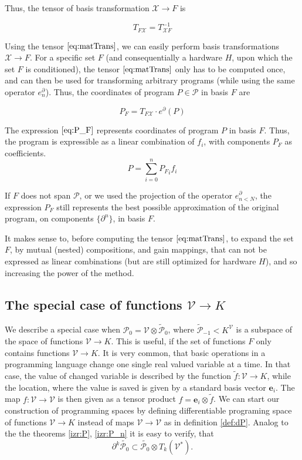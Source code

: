 \documentclass{article}
\newcommand{\VV}{\mathcal{V}}
\newcommand{\e}{\mathbf{e}}
\newcommand{\X}{\mathcal{X}}
\newcommand{\dP}{\mathcal{P}}
\newcommand{\D}{\partial}
\begin{document}
  Thus, the tensor of basis transformation $\X\to F$ is
  
  \begin{equation}\label{eq:matTrans}
  T_{F\X}=T_{\X F}^{-1}
  \end{equation}
  
  Using the tensor $\eqref{eq:matTrans}$, we can easily perform basis transformations $\X\to F$. For a specific set $F$ (and consequentially a hardware $H$, upon which the set $F$ is conditioned), the tensor $\eqref{eq:matTrans}$ only has to be computed once, and can then be used for transforming arbitrary programs (while using the same operator $e^\D_n$).
  Thus, the coordinates of program $P\in\dP$ in basis $F$ are
  
  \begin{equation}\label{eq:P_F}
  	P_F=T_{F\X}\cdot e^\D(P)
  \end{equation}
  
  The expression $\eqref{eq:P_F}$ represents coordinates of program $P$ in basis $F$. Thus, the program is expressible as a linear combination of $f_i$, with components $P_F$ as coefficients.
  \begin{equation}
  P=\sum\limits_{i=0}^{n}{P_F}_if_i
  \end{equation}
  
  If $F$ does not span $\dP$, or we used the projection of the operator $e^\D_{n<N}$, the expression $P_F$ still represents the best possible approximation of the original program, on components $\{\D^n\}$, in basis $F$.
  
  It makes sense to, before computing the tensor $\eqref{eq:matTrans}$, to expand the set $F$, by mutual (nested) compositions, and gain mappings, that can not be expressed as linear combinations (but are still optimized for hardware $H$), and so increasing the power of the method.
\subsection{The special case of functions $\VV\to K$}
We describe a special case when $\dP_0=\VV\otimes\tilde{\dP}_0$, where
$\tilde{\dP}_{-1}<K^\VV$ is a subspace of the space of functions $\VV\to K$. This is
useful, if the set of functions $F$ only contains functions $\VV\to K$. It is
very common, that basic operations in a programming language change one single
real valued variable at a time. In that case, the value of changed variable is
described by the function $\tilde{f}:\VV\to K$, while the location, where the
value is saved is given by a standard basis vector $\e_i$. The map $f:\VV\to \VV$
is then given as a tensor product $f=\e_i\otimes \tilde{f}$. We can start our
construction of programming spaces by defining differentiable programing space
of functions $\VV\to K$ instead of maps $\VV\to \VV$ as in definition
\ref{def:dP}. Analog to the  the theorems \ref{izr:P}, \ref{izr:P_n} it is easy
to verify, that 
\begin{equation}
  \label{eq:tilda_dP}
  \D^k\tilde{\dP_0}\subset\tilde{\dP_0}\otimes T_k(\VV^*).
\end{equation}
\end{document}
